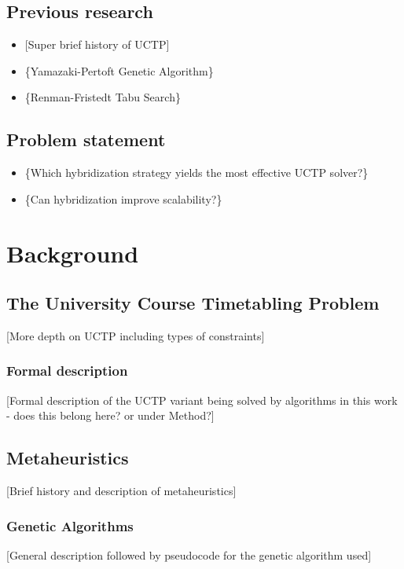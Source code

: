 \documentclass[bachelor]{kththesis}
\newcommand{\blue}[1]{{\color{blue} [#1]}}
\newcommand{\red}[1]{{\color{red} \{#1\}}}
\begin{document}
\section{Previous research}
\begin{itemize}
\item \blue{Super brief history of UCTP}
\item \red{Yamazaki-Pertoft Genetic Algorithm\parencite{yamazaki-pertoft}}
\item \red{Renman-Fristedt Tabu Search\parencite{renman-fristedt}}
\end{itemize}

\section{Problem statement}
\begin{itemize}
\item \red{Which hybridization strategy yields the most effective UCTP solver?}
\item \red{Can hybridization improve scalability?}
\end{itemize}

\chapter{Background}
\section{The University Course Timetabling Problem}
\blue{More depth on UCTP including types of constraints}

\subsection{Formal description}
\blue{Formal description of the UCTP variant being solved by algorithms in this work - does this belong here? or under Method?}

\section{Metaheuristics}
\blue{Brief history and description of metaheuristics}

\subsection{Genetic Algorithms}
\blue{General description followed by pseudocode for the genetic algorithm used}
\end{document}
